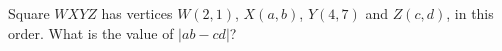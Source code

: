 Square $WXYZ$ has vertices $W(2,1)$, $X(a,b)$, $Y(4,7)$ and $Z(c,d)$, in this order. What is the value of $|ab-cd|$?
